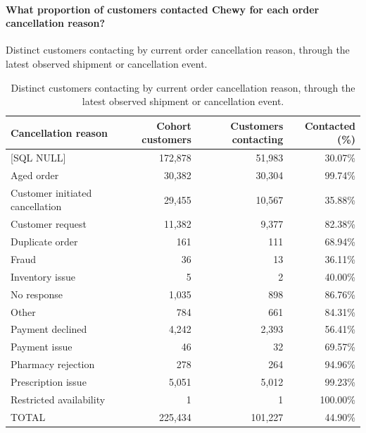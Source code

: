 \paragraph{What proportion of customers contacted Chewy for each order cancellation reason?}
Distinct customers contacting by current order cancellation reason, through the latest observed shipment or cancellation event.

\begin{table}[!htbp]
\centering
\caption{Distinct customers contacting by current order cancellation reason, through the latest observed shipment or cancellation event.}
\label{tab:customer-contacts-by-cancellation-reason}
\small
\begin{tabular}{@{}lrrr@{}}
\toprule
Cancellation reason & Cohort customers & Customers contacting & Contacted (\%) \\
\midrule

{[SQL NULL]} & 172,878 & 51,983 & 30.07\% \\
\rowcolor{yellow!35}
{Aged order} & 30,382 & 30,304 & 99.74\% \\

{Customer initiated cancellation} & 29,455 & 10,567 & 35.88\% \\

{Customer request} & 11,382 & 9,377 & 82.38\% \\

{Duplicate order} & 161 & 111 & 68.94\% \\

{Fraud} & 36 & 13 & 36.11\% \\

{Inventory issue} & 5 & 2 & 40.00\% \\

{No response} & 1,035 & 898 & 86.76\% \\

{Other} & 784 & 661 & 84.31\% \\

{Payment declined} & 4,242 & 2,393 & 56.41\% \\

{Payment issue} & 46 & 32 & 69.57\% \\

{Pharmacy rejection} & 278 & 264 & 94.96\% \\

{Prescription issue} & 5,051 & 5,012 & 99.23\% \\

{Restricted availability} & 1 & 1 & 100.00\% \\
\midrule
{TOTAL} & 225,434 & 101,227 & 44.90\% \\
\bottomrule
\end{tabular}


\end{table}
